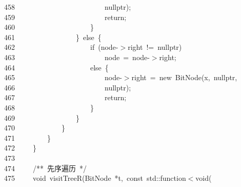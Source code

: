 \documentclass[11pt,a4paper]{ctexart}
\newcommand{\hlstd}[1]{\textcolor[rgb]{0.2,0.2,0.2}{#1}}
\newcommand{\hlcom}[1]{\textcolor[rgb]{0.59,0.59,0.59}{#1}}
\newcommand{\hlopt}[1]{\textcolor[rgb]{0.2,0.2,0.2}{#1}}
\newcommand{\hllin}[1]{\textcolor[rgb]{0.59,0.59,0.59}{#1}}
\newcommand{\hlkwa}[1]{\textcolor[rgb]{0.23,0.42,0.78}{#1}}
\newcommand{\hlkwb}[1]{\textcolor[rgb]{0.63,0,0.31}{#1}}
\newcommand{\hlkwc}[1]{\textcolor[rgb]{0,0.63,0.31}{#1}}
\newcommand{\hlkwd}[1]{\textcolor[rgb]{0.78,0.23,0.41}{#1}}
\begin{document}
\hllin{458\ }\hlstd{}\hlstd{\ \ \ \ \ \ \ \ \ \ \ \ \ \ \ \ \ \ \ \ \ \ \ \ }\hlstd{}\hlkwc{nullptr}\hlstd{}\hlopt{);}\\
\hllin{459\ }\hlstd{}\hlstd{\ \ \ \ \ \ \ \ \ \ \ \ \ \ \ \ \ \ \ \ \ \ \ \ }\hlstd{}\hlkwa{return}\hlstd{}\hlopt{;}\\
\hllin{460\ }\hlstd{}\hlstd{\ \ \ \ \ \ \ \ \ \ \ \ \ \ \ \ \ \ \ \ }\hlstd{}\hlopt{\}}\\
\hllin{461\ }\hlstd{}\hlstd{\ \ \ \ \ \ \ \ \ \ \ \ \ \ \ \ }\hlstd{}\hlopt{\}\ }\hlstd{}\hlkwa{else\ }\hlstd{}\hlopt{\{}\\
\hllin{462\ }\hlstd{}\hlstd{\ \ \ \ \ \ \ \ \ \ \ \ \ \ \ \ \ \ \ \ }\hlstd{}\hlkwa{if\ }\hlstd{}\hlopt{(}\hlstd{node}\hlopt{{-}$>$}\hlstd{right\ }\hlopt{!=\ }\hlstd{}\hlkwc{nullptr}\hlstd{}\hlopt{)}\\
\hllin{463\ }\hlstd{}\hlstd{\ \ \ \ \ \ \ \ \ \ \ \ \ \ \ \ \ \ \ \ \ \ \ \ }\hlstd{node\ }\hlopt{=\ }\hlstd{node}\hlopt{{-}$>$}\hlstd{right}\hlopt{;}\\
\hllin{464\ }\hlstd{}\hlstd{\ \ \ \ \ \ \ \ \ \ \ \ \ \ \ \ \ \ \ \ }\hlstd{}\hlkwa{else\ }\hlstd{}\hlopt{\{}\\
\hllin{465\ }\hlstd{}\hlstd{\ \ \ \ \ \ \ \ \ \ \ \ \ \ \ \ \ \ \ \ \ \ \ \ }\hlstd{node}\hlopt{{-}$>$}\hlstd{right\ }\hlopt{=\ }\hlstd{}\hlkwa{new\ }\hlstd{}\hlkwd{BitNode}\hlstd{}\hlopt{(}\hlstd{x}\hlopt{,\ }\hlstd{}\hlkwc{nullptr}\hlstd{}\hlopt{,}\Righttorque\\
\hllin{466\ }\hlstd{}\hlstd{\ \ \ \ \ \ \ \ \ \ \ \ \ \ \ \ \ \ \ \ \ \ \ \ }\hlstd{}\hlkwc{nullptr}\hlstd{}\hlopt{);}\\
\hllin{467\ }\hlstd{}\hlstd{\ \ \ \ \ \ \ \ \ \ \ \ \ \ \ \ \ \ \ \ \ \ \ \ }\hlstd{}\hlkwa{return}\hlstd{}\hlopt{;}\\
\hllin{468\ }\hlstd{}\hlstd{\ \ \ \ \ \ \ \ \ \ \ \ \ \ \ \ \ \ \ \ }\hlstd{}\hlopt{\}}\\
\hllin{469\ }\hlstd{}\hlstd{\ \ \ \ \ \ \ \ \ \ \ \ \ \ \ \ }\hlstd{}\hlopt{\}}\\
\hllin{470\ }\hlstd{}\hlstd{\ \ \ \ \ \ \ \ \ \ \ \ }\hlstd{}\hlopt{\}}\\
\hllin{471\ }\hlstd{}\hlstd{\ \ \ \ \ \ \ \ }\hlstd{}\hlopt{\}}\\
\hllin{472\ }\hlstd{}\hlstd{\ \ \ \ }\hlstd{}\hlopt{\}}\\
\hllin{473\ }\hlstd{}\\
\hllin{474\ }\hlstd{}\hlstd{\ \ \ \ }\hlstd{}\hlcom{/{*}{*}\ 先序遍历\ {*}/}\hlstd{}\\
\hllin{475\ }\hlstd{}\hlstd{\ \ \ \ }\hlstd{}\hlkwb{void\ }\hlstd{}\hlkwd{visitTreeR}\hlstd{}\hlopt{(}\hlstd{BitNode\ }\hlopt{{*}}\hlstd{t}\hlopt{,\ }\hlstd{}\hlkwb{const\ }\hlstd{}\hlkwc{std}\hlstd{}\hlopt{::}\hlstd{function}\hlopt{$<$}\hlstd{}\hlkwb{void}\hlstd{}\hlopt{(}\Righttorque\\
\end{document}
